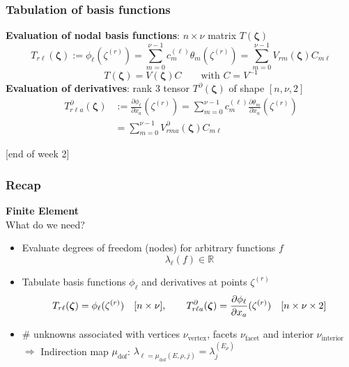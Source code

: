 \documentclass{beamer}
\renewcommand{\vec}[1]{\boldsymbol{#1}}
\begin{document}

\begin{frame}
\frametitle{Tabulation of basis functions}
\textbf{Evaluation of nodal basis functions}: $n\times \nu$ matrix $T(\vec{\zeta})$
$$
T_{r\ell}(\boldsymbol{\zeta}) := \phi_\ell(\zeta^{(r)}) = \sum_{m=0}^{\nu-1} c_m^{(\ell)} \theta_m(\zeta^{(r)}) = \sum_{m=0}^{\nu-1}V_{rm}(\boldsymbol{\zeta})C_{m\ell}
$$
$$
T(\boldsymbol{\zeta}) = V(\boldsymbol{\zeta}) C\qquad\text{with $C=V^{-1}$}
$$
\textbf{Evaluation of derivatives}: rank 3 tensor $T^\partial(\vec{\zeta})$ of shape $[n,\nu,2]$
$$
\begin{aligned}
T^\partial_{r\ell a}(\boldsymbol{\zeta}) &:= \frac{\partial \phi_\ell}{\partial x_a}(\zeta^{(r)}) 
 = \sum_{m=0}^{\nu-1} c_m^{(\ell)} \frac{\partial \theta_m}{\partial x_a}(\zeta^{(r)}) \\
 &= \sum_{m=0}^{\nu-1} V^\partial_{rma}(\boldsymbol{\zeta})C_{m\ell}
 \end{aligned}
$$
{\begin{flushright} {\footnotesize [end of week 2]} \end{flushright}}
\end{frame}



\begin{frame}
\frametitle{Recap}
\textbf{Finite Element}\\
What do we need?
\begin{itemize}
\item Evaluate degrees of freedom (nodes) for arbitrary functions $f$
$$
\lambda_\ell(f)\in \mathbb{R}
$$
\item Tabulate basis functions $\phi_\ell$ and derivatives at points $\zeta^{(r)}$
$$
T_{r\ell}(\boldsymbol{\zeta}) = \phi_\ell(\zeta^{(r)})\quad {\footnotesize [n\times \nu]},\qquad
T^\partial_{r\ell a}(\boldsymbol{\zeta}) = \frac{\partial \phi_\ell}{\partial x_a}(\zeta^{(r)})\quad {\footnotesize [n\times \nu\times 2]}
$$
\item \# unknowns associated with vertices $\nu_{\text{vertex}}$, facets $\nu_{\text{facet}}$ and interior $\nu_{\text{interior}}$\\
$\Rightarrow$ Indirection map $\mu_{\text{dof}}$: $\lambda_{\ell=\mu_{\text{dof}}(E,\rho,j)} = \lambda_j^{(E_\rho)}$
\end{itemize}
\end{frame}
\end{document}
